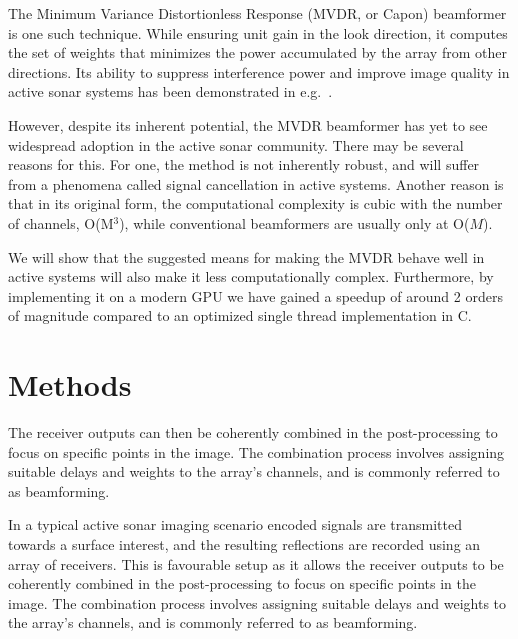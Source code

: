 \documentclass[10pt,a4paper]{article}
\newcommand\1{\vec 1}
\begin{document}
The Minimum Variance Distortionless Response (MVDR, or Capon) beamformer is one such technique. While ensuring unit gain in the look direction, it computes the set of weights that minimizes the power accumulated by the array from other directions. Its ability to suppress interference power and improve image quality in active sonar systems has been demonstrated in e.g.~\cite{Blomberg2012a,Blomberg2011,Dursun2009,Lo2004}.

However, despite its inherent potential, the \gls{MVDR} beamformer has yet to see widespread adoption in the active sonar community. There may be several reasons for this. For one, the method is not inherently robust, and will suffer from a phenomena called signal cancellation in active systems. Another reason is that in its original form, the computational complexity is cubic with the number of channels, O(M$^3$), while conventional beamformers are usually only at O($M$).

We will show that the suggested means for making the \gls{MVDR} behave well in active systems will also make it less computationally complex. Furthermore, by implementing it on a modern \gls{GPU} we have gained a speedup of around 2 orders of magnitude compared to an optimized single thread implementation in C.




\newpage
\section{Methods}\label{methods}

The receiver outputs can then be coherently combined in the post-processing to focus on specific points in the image. The combination process involves assigning suitable delays and weights to the array's channels, and is commonly referred to as beamforming.

In a typical active sonar imaging scenario encoded signals are transmitted towards a surface interest, and the resulting reflections are recorded using an array of receivers. This is favourable setup as it allows the receiver outputs to be coherently combined in the post-processing to focus on specific points in the image. The combination process involves assigning suitable delays and weights to the array's channels, and is commonly referred to as beamforming.
\end{document}
